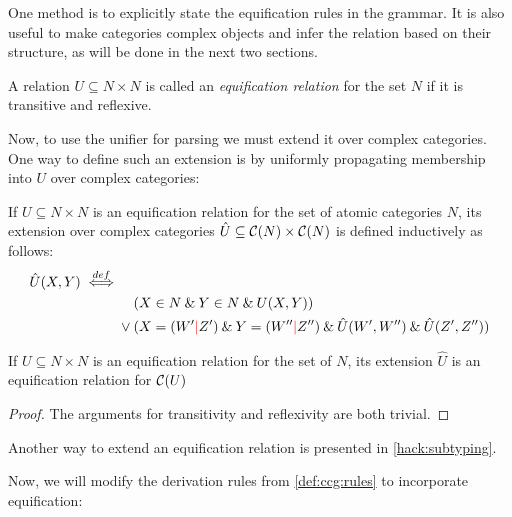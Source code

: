 \documentclass[main.tex]{subfiles}
\begin{document}
One method is to explicitly state the equification rules in the grammar.
It is also useful to make categories complex objects and infer the relation
based on their structure, as will be done in the next two sections.

\begin{defn}
    A relation $U \subseteq N \times N$ is called an
    \emph{equification relation} for the set $N$ if it is transitive
    and reflexive.
\end{defn}

Now, to use the unifier for parsing we must extend it over complex categories.
One way to define such an extension is by uniformly propagating membership
into $U$ over complex categories:
\begin{defn}\label{def:rel:uniform}
    If $U \subseteq N \times N$ is an equification relation
    for the set of
    atomic categories $N$, its extension over complex categories
    $\hat{U} \subseteq \mathcal{C}( N ) \times \mathcal{C}( N )$ is defined
    inductively as follows:
    \begin{align*}
        \hat{U}(X, Y) \defiff & \\
        & \phantom{{}\lor{}} (X \in N \land Y \in N \land U(X, Y)) \\
        & \lor (X = (W' \mc Z') \land Y = (W'' \mc Z'') \land \hat{U}(W', W'')
        \land \hat{U}(Z', Z'')) \\
    \end{align*}
\end{defn}

\begin{property}
    If $U \subseteq N \times N$ is an equification relation 
    for the set of
    $N$, its extension $\hat{U}$ is an equification relation for $\mathcal{C}( U )$
\end{property}
\begin{proof}
    The arguments for transitivity and reflexivity are both trivial.
\end{proof}

Another way to extend an equification relation is presented in \cref{hack:subtyping}.

Now, we will modify the derivation rules from \cref{def:ccg:rules} to incorporate
equification:
    
\end{document}
